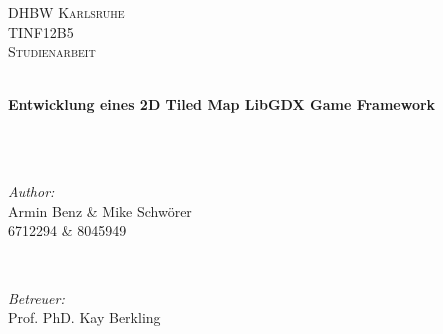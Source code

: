 \begin{titlepage}

\center %
 

\textsc{\LARGE DHBW Karlsruhe}\\[1.5cm] %
\textsc{\Large TINF12B5}\\[0.5cm] %
\textsc{\large Studienarbeit}\\[0.5cm] %


\HRule \\[0.4cm]
{ 
\begin{singlespace}
\huge \bfseries 
Entwicklung eines 2D Tiled Map LibGDX Game Framework
\end{singlespace}
} ~\\[0.4cm] %
\HRule \\[1.5cm]
 

\begin{minipage}{0.4\textwidth}
\begin{flushleft} \large
\emph{Author:}\\
Armin Benz \& Mike Schwörer\\ %
\textsc{6712294 \& 8045949}   %
\end{flushleft}
\end{minipage}
~
\begin{minipage}{0.4\textwidth}
\begin{flushright} \large
\emph{Betreuer:} \\
Prof. PhD. Kay Berkling \\%
\strut
\end{flushright}
\end{minipage}\\[3cm]


\end{titlepage}
